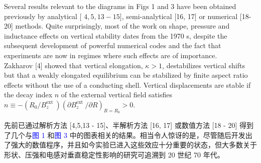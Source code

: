\documentclass[utf8]{ctexart}
\newcommand\enzhbox[2]{
  	\quad\par \begin{paracol}{2} \colseprulecolor{black} 
  		\begin{spacing}{1.0}
  			\footnotesize  #1
  		\end{spacing}
  		\switchcolumn[1] 
  		#2
  	\end{paracol} \quad\par
  }
\begin{document}
\begin{sloppypar}
\enzhbox{  Several results relevant to the diagrams in Figs 1 and 3 have been obtained previously by analytical [ $4,5,13-15]$, semi-analytical \textcolor{green!50!black}{[16, 17]} or numerical \textcolor{green!50!black}{[18-20]} methods. Quite surprisingly, most of the work on shape, pressure and inductance effects on vertical stability dates from the 1970 s, despite the subsequent development of powerful numerical codes and the fact that experiments are now in regimes where such effects are of importance.\\ Zakharov \textcolor{green!50!black}{[4]} showed that vertical elongation, $\kappa>1$, destabilizes vertical shifts but that a weakly elongated equilibrium can be stabilized by finite aspect ratio effects without the use of a conducting shell. Vertical displacements are stable if the decay index $n$ of the external vertical field satisfies $n \equiv-\left(R_{0} / B_{z}^{\text {ext }}\right)\left(\partial B_{z}^{\text {ext }} / \partial R\right)_{R=R_{0}}>0$.}{
先前已通过解析方法 [4,5,13 - 15]、半解析方法 \textcolor{green!50!black}{[16, 17]} 或数值方法 [18 - 20] 得到了几个与\textcolor{blue}{图 1} 和\textcolor{blue}{图 3} 中的图表相关的结果。相当令人惊讶的是，尽管随后开发出了强大的数值程序，并且如今实验已进入这些效应十分重要的状态，但大多数关于形状、压强和电感对垂直稳定性影响的研究可追溯到 20 世纪 70 年代。

}
\end{sloppypar}
\end{document}
